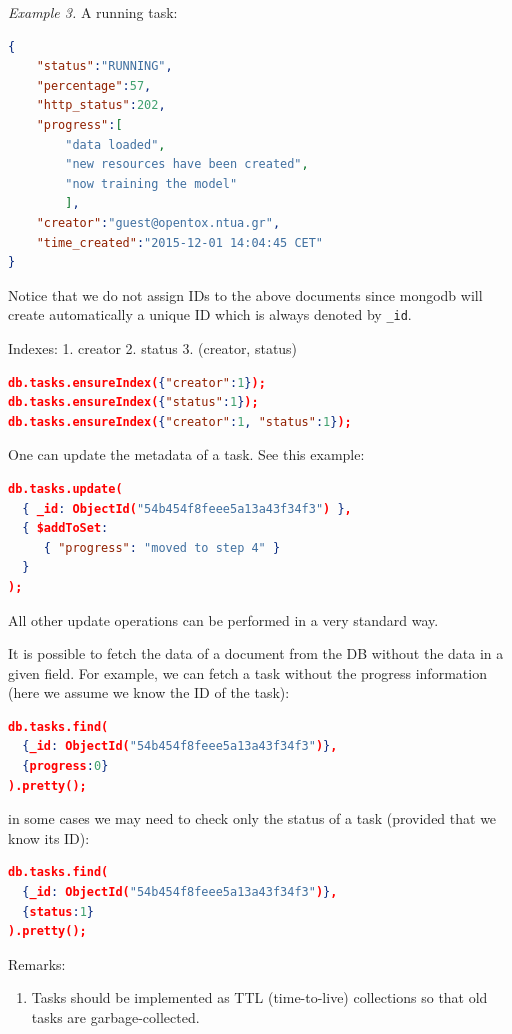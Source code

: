 \noindent \textit{Example 3.} A running task:
\begin{lstlisting}[language=json]
{ 
    "status":"RUNNING", 
    "percentage":57, 
    "http_status":202, 
    "progress":[ 
        "data loaded", 
        "new resources have been created", 
        "now training the model" 
        ], 
    "creator":"guest@opentox.ntua.gr", 
    "time_created":"2015-12-01 14:04:45 CET" 
} 
\end{lstlisting}

Notice that we do not assign IDs to the above documents since 
mongodb will create automatically a unique ID which is always 
denoted by \texttt{\_id}.

Indexes:
1. creator
2. status
3. (creator, status)

\begin{lstlisting}[language=json]
db.tasks.ensureIndex({"creator":1});
db.tasks.ensureIndex({"status":1});
db.tasks.ensureIndex({"creator":1, "status":1});
\end{lstlisting}

One can update the metadata of a task. 
See this example:
\begin{lstlisting}[language=json]
db.tasks.update( 
  { _id: ObjectId("54b454f8feee5a13a43f34f3") },  
  { $addToSet:  
     { "progress": "moved to step 4" } 
  } 
); 
\end{lstlisting}

All other update operations can be performed in a very standard way.

It is possible to fetch the data of a document from the DB without the data in a given field. 
For example, we can fetch a task without the progress information 
(here we assume we know the ID of the task):

\begin{lstlisting}[language=json]
db.tasks.find(
  {_id: ObjectId("54b454f8feee5a13a43f34f3")}, 
  {progress:0}
).pretty();
\end{lstlisting}

in some cases we may need to check only the status of a task (provided that we know its ID):
\begin{lstlisting}[language=json]
db.tasks.find(
  {_id: ObjectId("54b454f8feee5a13a43f34f3")}, 
  {status:1}
).pretty();
\end{lstlisting}

Remarks:
\begin{enumerate}
 \item Tasks should be implemented as TTL (time-to-live) collections so that old tasks are garbage-collected.
\end{enumerate}

